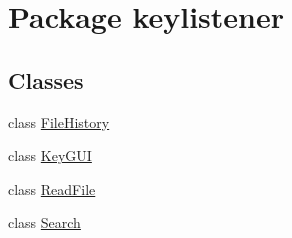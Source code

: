 \hypertarget{namespacekeylistener}{}\section{Package keylistener}
\label{namespacekeylistener}
\subsection*{Classes}
\begin{DoxyCompactItemize}
\item 
class \hyperlink{classkeylistener_1_1_file_history}{File\+History}
\item 
class \hyperlink{classkeylistener_1_1_key_g_u_i}{Key\+G\+UI}
\item 
class \hyperlink{classkeylistener_1_1_read_file}{Read\+File}
\item 
class \hyperlink{classkeylistener_1_1_search}{Search}
\end{DoxyCompactItemize}
